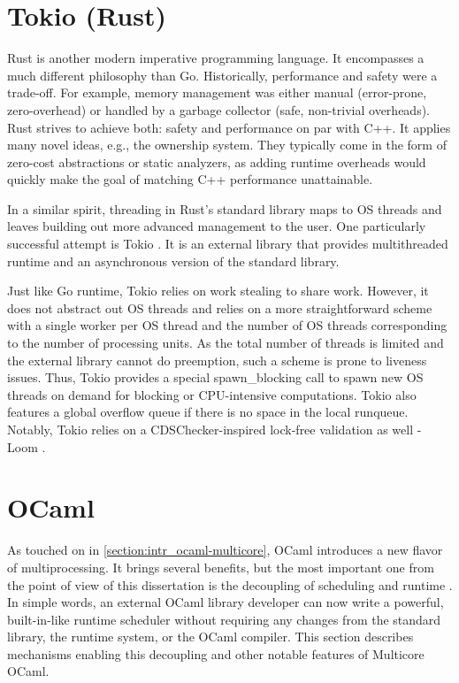 \documentclass[12pt,a4paper,twoside]{report}
\begin{document}
\section{Tokio (Rust)}
\label{section:rel-work-rust}
Rust is another modern imperative programming language. It encompasses a much different philosophy than Go. Historically, performance and safety were a trade-off. For example, memory management was either manual (error-prone, zero-overhead) or handled by a garbage collector (safe, non-trivial overheads). Rust strives to achieve both: safety and performance on par with C++. It applies many novel ideas, e.g., the ownership system. They typically come in the form of zero-cost abstractions or static analyzers, as adding runtime overheads would quickly make the goal of matching C++ performance unattainable. 

In a similar spirit, threading in Rust's standard library maps to OS threads and leaves building out more advanced management to the user. One particularly successful attempt is Tokio \cite{TokioAna8:online}. It is an external library that provides multithreaded runtime and an asynchronous version of the standard library.

Just like Go runtime, Tokio relies on work stealing to share work. However, it does not abstract out OS threads and relies on a more straightforward scheme with a single worker per OS thread and the number of OS threads corresponding to the number of processing units. As the total number of threads is limited and the external library cannot do preemption, such a scheme is prone to liveness issues. Thus, Tokio provides a special spawn\_blocking call to spawn new OS threads on demand for blocking or CPU-intensive computations. Tokio also features a global overflow queue if there is no space in the local runqueue. Notably, Tokio relies on a CDSChecker-inspired lock-free validation as well - Loom \cite{tokiorsl53:online}.

\section{OCaml}
\label{section:background_ocaml}

As touched on in \ref{section:intr_ocaml-multicore}, OCaml introduces a new flavor of multiprocessing. It brings several benefits, but the most important one from the point of view of this dissertation is the decoupling of scheduling and runtime \cite{stephen_effective_nodate}. In simple words, an external OCaml library developer can now write a powerful, built-in-like runtime scheduler without requiring any changes from the standard library, the runtime system, or the OCaml compiler. This section describes mechanisms enabling this decoupling and other notable features of Multicore OCaml.
\end{document}
